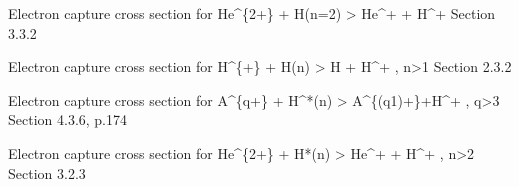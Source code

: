 \documentclass[letterpaper,10pt,english]{sphinxmanual}
\begin{document}
\begin{fulllineitems}
\label{\detokenize{aurora:aurora.janev_smith_rates.js_sigma_cx_n2_q2}}
Electron capture cross section for
He\textasciicircum{}\{2+\} + H(n=2) \textendash{}\textgreater{} He\textasciicircum{}+ + H\textasciicircum{}+
Section 3.3.2

\end{fulllineitems}


\begin{fulllineitems}
\label{\detokenize{aurora:aurora.janev_smith_rates.js_sigma_cx_ng1_q1}}
Electron capture cross section for
H\textasciicircum{}\{+\} + H(n) \textendash{}\textgreater{} H + H\textasciicircum{}+ , n\textgreater{}1
Section 2.3.2

\end{fulllineitems}


\begin{fulllineitems}
\label{\detokenize{aurora:aurora.janev_smith_rates.js_sigma_cx_ng1_qg3}}
Electron capture cross section for
A\textasciicircum{}\{q+\} + H\textasciicircum{}*(n) \textendash{}\textgreater{} A\textasciicircum{}\{(q\sphinxhyphen{}1)+\}+H\textasciicircum{}+ , q\textgreater{}3
Section 4.3.6, p.174

\end{fulllineitems}


\begin{fulllineitems}
\label{\detokenize{aurora:aurora.janev_smith_rates.js_sigma_cx_ng2_q2}}
Electron capture cross section for
He\textasciicircum{}\{2+\} + H*(n) \textendash{}\textgreater{} He\textasciicircum{}+ + H\textasciicircum{}+ , n\textgreater{}2
Section 3.2.3

\end{fulllineitems}
\end{document}
